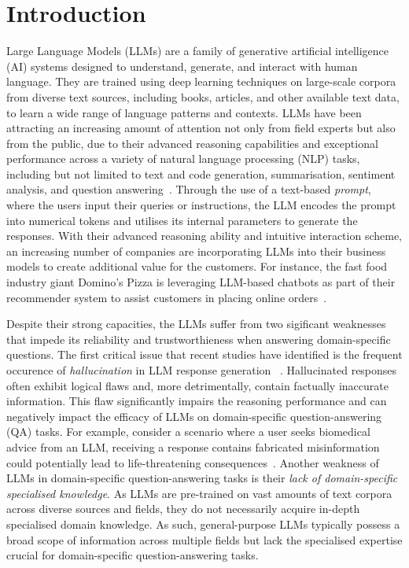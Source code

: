 \section*{Introduction}\label{sec:introduction}

Large Language Models (LLMs) are a family of generative artificial intelligence (AI) systems designed to understand, generate, and interact with human language. They are trained using deep learning techniques on large-scale corpora from diverse text sources, including books, articles, and other available text data, to learn a wide range of language patterns and contexts. LLMs have been attracting an increasing amount of attention not only from field experts but also from
the public, due to their advanced reasoning capabilities and exceptional performance across a variety of natural language processing (NLP)
tasks, including but not limited to text and code generation, summarisation, sentiment analysis, and question answering~\parencite{brown2020language, zero-shot-reasoner, palm, won2024scaling}.
Through the use of a text-based \emph{prompt}, where the users input their queries or instructions,
the LLM encodes the prompt into numerical tokens and utilises its internal parameters
to generate the responses.
With their advanced reasoning ability and intuitive interaction scheme, an increasing number of companies are incorporating LLMs into their business models to create additional value for the customers. For instance, the fast food industry giant Domino's Pizza is leveraging LLM-based chatbots as part of their recommender system
to assist customers in placing online orders~\parencite{dominos_ai}.

Despite their strong capacities, the LLMs suffer from two sigificant weaknesses that impede its reliability and trustworthieness when answering domain-specific questions. 
The first critical issue that recent studies have identified is the frequent occurence of \emph{hallucination} in LLM response generation
~\parencite{kgr, kalm-prompting, huang2023survey, ji2023survey}. 
Hallucinated responses often exhibit logical flaws and, more detrimentally, contain factually inaccurate information.
This flaw significantly impairs the reasoning performance and can negatively impact the efficacy of LLMs on domain-specific question-answering (QA) tasks.
For example, consider a scenario where a user seeks biomedical advice from an LLM, receiving a response contains fabricated misinformation could potentially lead to life-threatening consequences~\parencite{pmc-llama}.
Another weakness of LLMs in domain-specific question-answering tasks is their \emph{lack of domain-specific specialised knowledge}.
As LLMs are pre-trained on vast amounts of text corpora across diverse sources and fields, they do not necessarily acquire in-depth specialised domain knowledge. As such, general-purpose LLMs typically possess a broad scope of information across multiple fields but lack the specialised expertise crucial for domain-specific question-answering tasks.

